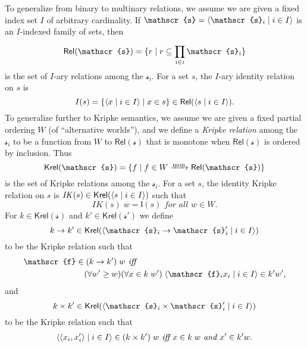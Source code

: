 \documentclass[sigplan,screen,nonacm,balance=false]{acmart}
\theoremstyle{plain}
\DeclarePairedDelimiter{\set}{\{}{\}}
\DeclarePairedDelimiter{\pair}{\langle}{\rangle}
\newcommand{\IK}{\mathit{IK}}
\newcommand{\Rel}{\mathsf{Rel}}
\newcommand{\Id}{\mathsf{I}}
\newcommand{\Krel}{\mathsf{Krel}}
\newcommand{\scrs}{\mathscr{s}}
\newcommand{\scrf}{\mathscr{f}}
\begin{document}
To generalize from binary to multinary relations, we assume we are given a fixed index set $I$ of arbitrary cardinality.
If $\scrs = \pair{\scrs_i \mid i \in I}$ is an $I$-indexed family of sets, then
%
\begin{equation*}
  \Rel(\scrs) = \set{r \mid r \subseteq \prod_{i \in i}^{} \scrs_i}
\end{equation*}
%
is the set of $I$-ary relations among the $\scrs_i$.
For a set $s$, the $I$-ary identity relation on $s$ is
%
\begin{equation*}
  I(s) = \set{\pair{x \mid i \in I} \mid x \in s} \in \Rel(\pair{s \mid i \in I}).
\end{equation*}
%
To generalize further to Kripke semantics, we assume we are given a fixed partial ordering $W$ (of ``alternative worlds''), and we define a \emph{Kripke relation} among the $\scrs_i$ to be a function from $W$ to $\Rel(\scrs)$ that is monotone when $\Rel(\scrs)$ is ordered by inclusion. Thus
%
\begin{equation*}
  \Krel(\scrs) = \set{f \mid f \in W \xrightarrow{\raisebox{0pt}[0pt][0pt]{$_\mathrm{mon}$}} \Rel(\scrs)}
\end{equation*}
%
is the set of Kripke relations among the $\scrs_i$.
For a set $s$, the identity Kripke relation on $s$ is $\IK(s) \in \Krel(\pair{s \mid i \in I})$ such that
%
\begin{equation*}
  \IK(s) \; w = \Id(s) \textit{ for all } w \in W.
\end{equation*}
%
For $k \in \Krel(\scrs)$ and $k' \in \Krel(\scrs')$ we define
%
\begin{equation*}
  k \to k' \in \Krel(\pair{\scrs_i \to \scrs'_i \mid i \in I})
\end{equation*}
%
to be the Kripke relation such that
%
\begin{align*}
  \scrf & \in (k \to k') \; w \textit{ iff } \\
  & \quad (\forall w' \geq w) (\forall x \in k \; w') \; \pair{\scrf_i x_i \mid i \in I} \in k' w',
\end{align*}
%
and
%
\begin{equation*}
  k \times k' \in \Krel(\pair{\scrs_i \times \scrs'_i \mid i \in I})
\end{equation*}
%
to be the Kripke relation such that
%
\begin{align*}
  \pair{\pair{x_i, x'_i} \mid i \in I} \in (k \times k') \; w \textit{ iff } x \in k \; w \textit{ and } x' \in k' w.
\end{align*}
\end{document}
